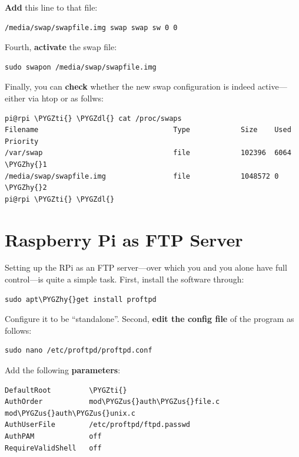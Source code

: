 \documentclass[letterpaper,10pt,english]{sphinxmanual}
\def\PYGZus{\char`\_}
\def\PYGZdl{\char`\$}
\def\PYGZhy{\char`\-}
\def\PYGZti{\char`\~}
\begin{document}
\textbf{Add} this line to that file:

\begin{Verbatim}[commandchars=\\\{\}]
/media/swap/swapfile.img swap swap sw 0 0
\end{Verbatim}

Fourth, \textbf{activate} the swap file:

\begin{Verbatim}[commandchars=\\\{\}]
sudo swapon /media/swap/swapfile.img
\end{Verbatim}

Finally, you can \textbf{check} whether the new swap configuration is indeed active---either via htop or as follws:

\begin{Verbatim}[commandchars=\\\{\}]
pi@rpi \PYGZti{} \PYGZdl{} cat /proc/swaps
Filename                                Type            Size    Used    Priority
/var/swap                               file            102396  6064    \PYGZhy{}1
/media/swap/swapfile.img                file            1048572 0       \PYGZhy{}2
pi@rpi \PYGZti{} \PYGZdl{}
\end{Verbatim}


\section{Raspberry Pi as FTP Server}
\label{01_ftp_server:raspberry-pi-as-ftp-server}\label{01_ftp_server::doc}
Setting up the RPi as an FTP server---over which you and you alone have full control---is quite a simple task. First, install the  software through:

\begin{Verbatim}[commandchars=\\\{\}]
sudo apt\PYGZhy{}get install proftpd
\end{Verbatim}

Configure it to be ``standalone''. Second, \textbf{edit the config file} of the program as follows:

\begin{Verbatim}[commandchars=\\\{\}]
sudo nano /etc/proftpd/proftpd.conf
\end{Verbatim}

Add the following \textbf{parameters}:

\begin{Verbatim}[commandchars=\\\{\}]
DefaultRoot         \PYGZti{}
AuthOrder           mod\PYGZus{}auth\PYGZus{}file.c  mod\PYGZus{}auth\PYGZus{}unix.c
AuthUserFile        /etc/proftpd/ftpd.passwd
AuthPAM             off
RequireValidShell   off
\end{Verbatim}
\end{document}
